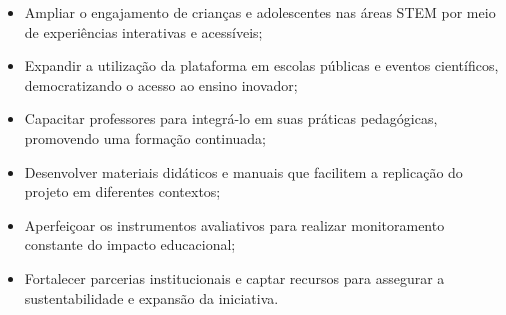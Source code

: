 \begin{itemize}
  \item Ampliar o engajamento de crianças e adolescentes nas áreas STEM por meio de experiências interativas e acessíveis;  
  \item Expandir a utilização da plataforma em escolas públicas e eventos científicos, democratizando o acesso ao ensino inovador;  
  \item Capacitar professores para integrá-lo em suas práticas pedagógicas, promovendo uma formação continuada;  
  \item Desenvolver materiais didáticos e manuais que facilitem a replicação do projeto em diferentes contextos;  
  \item Aperfeiçoar os instrumentos avaliativos para realizar monitoramento constante do impacto educacional;  
  \item Fortalecer parcerias institucionais e captar recursos para assegurar a sustentabilidade e expansão da iniciativa.  
\end{itemize}